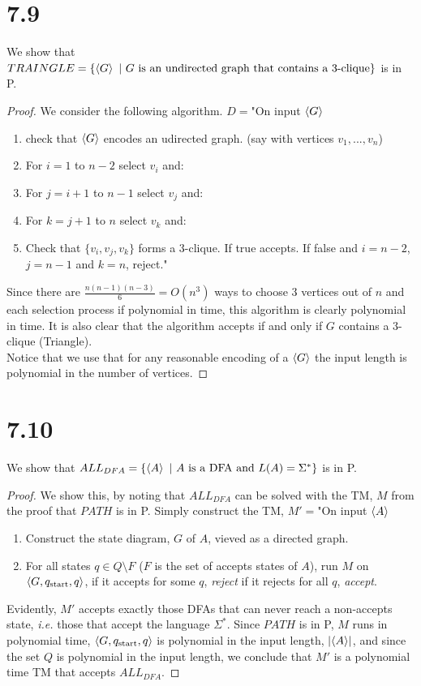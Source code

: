 \documentclass[a4paper,11pt]{article}
\newcommand{\abs}[1]{\left\lvert #1 \right\rvert}
\newcommand{\ie}{\emph{i.e.} }
\numberwithin{equation}{section}
\begin{document}
\section*{7.9}
We show that $ TRAINGLE=\{\braket{G}\ \vert\ G\text{ is an undirected graph that contains a }3\text{-clique}\} $ is in P.
\begin{proof}
	We consider the following algorithm. $ D= $"On input $ \braket{G} $\begin{enumerate}
		\item check that $ \braket{G} $ encodes an udirected graph. (say with vertices $ v_1,...,v_n $)
		\item For $ i=1 $ to $ n-2 $ select $ v_i $ and:
		\item \qquad For $ j=i+1 $ to $ n-1 $ select $ v_j $ and:
		\item \qquad \qquad For $ k=j+1 $ to $ n $ select $ v_k $ and:
		\item \qquad\qquad\qquad Check that $ \{v_i,v_j,v_k\} $ forms a $ 3 $-clique. If true accepts. If false and $ i=n-2 $, $ j=n-1 $ and $ k=n $, reject."
	\end{enumerate}
	Since there are $ \frac{n(n-1)(n-3)}{6}=O(n^3) $ ways to choose $ 3 $ vertices out of $ n $ and each selection process if polynomial in time, this algorithm is clearly polynomial in time. It is also clear that the algorithm accepts if and only if $ G $ contains a $ 3 $-clique (Triangle).\\
	Notice that we use that for any reasonable encoding of a $ \braket{G} $ the input length is polynomial in the number of vertices.
\end{proof}

\section*{7.10}
We show that $ ALL_{DFA}=\{\braket{A}\ \vert\ A\text{ is a DFA and }L(A)=\Sigma^* \} $ is in P.
\begin{proof}
	We show this, by noting that $ ALL_{DFA} $ can be solved with the TM, $ M $ from the proof that $ PATH $ is in P. Simply construct the TM, $ M'= $"On input $ \braket{A} $\begin{enumerate}
		\item Construct the state diagram, $ G $ of $ A $, vieved as a directed graph.
		\item For all states $ q\in Q\setminus F $ ($ F $ is the set of accepts states of $ A $), run $ M $ on $ \braket{G,q_{\text{start}},q} $, if it accepts for some $ q $, \emph{reject} if it rejects for all $ q $, \emph{accept}.
	\end{enumerate}
	Evidently, $ M' $ accepts exactly those DFAs that can never reach a non-accepts state, \ie those that accept the language $ \Sigma^* $. Since $ PATH $ is in P, $ M $ runs in polynomial time, $ \braket{G,q_{\text{start}},q} $ is polynomial in the input length, $ \abs{\braket{A}} $, and since the set $ Q $ is polynomial in the input length, we conclude that $ M' $ is a polynomial time TM that accepts $ ALL_{DFA} $.
\end{proof}
\end{document}
